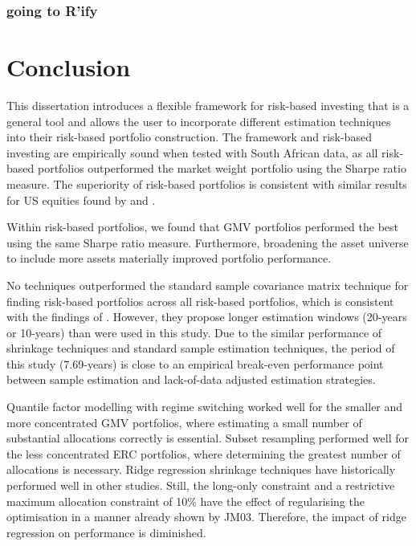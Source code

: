 \documentclass[
]{article}
\begin{document}
\hypertarget{going-to-rify}{%
\subsubsection{going to R'ify}\label{going-to-rify}}

\hypertarget{conclusion}{%
\section{Conclusion}\label{conclusion}}

This dissertation introduces a flexible framework for risk-based investing that is a general tool and
allows the user to incorporate different estimation techniques into their risk-based portfolio
construction. The framework and risk-based investing are empirically sound when tested with South African
data, as all risk-based portfolios outperformed the market weight portfolio using the Sharpe ratio
measure. The superiority of risk-based portfolios is consistent with similar results for US equities
found by \citet{DGL07} and \citet{K10}.

Within risk-based portfolios, we found that GMV portfolios performed the best using the same Sharpe ratio
measure. Furthermore, broadening the asset universe to include more assets materially improved portfolio
performance.

No techniques outperformed the standard sample covariance matrix technique for finding risk-based
portfolios across all risk-based portfolios, which is consistent with the findings of \citet{K10}. However,
they propose longer estimation windows (20-years or 10-years) than were used in this study. Due to the
similar performance of shrinkage techniques and standard sample estimation techniques, the period of this
study (7.69-years) is close to an empirical break-even performance point between sample estimation and
lack-of-data adjusted estimation strategies.

Quantile factor modelling with regime switching worked well for the smaller and more concentrated GMV
portfolios, where estimating a small number of substantial allocations correctly is essential. Subset
resampling performed well for the less concentrated ERC portfolios, where determining the greatest number
of allocations is necessary. Ridge regression shrinkage techniques have historically performed well in
other studies. Still, the long-only constraint and a restrictive maximum allocation constraint of 10\%
have the effect of regularising the optimisation in a manner already shown by JM03. Therefore, the
impact of ridge regression on performance is diminished.
\end{document}
